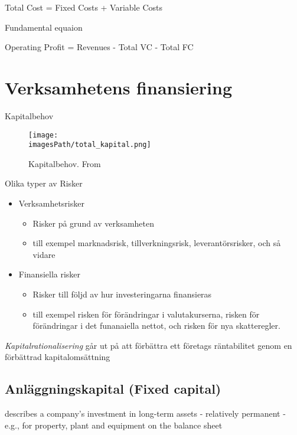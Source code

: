 \begin{center}
    Total Cost = Fixed Costs + Variable Costs
\end{center}

Fundamental equaion 
\begin{center}
    Operating Profit = Revenues - Total VC - Total FC
\end{center}

\section{Verksamhetens finansiering}
Kapitalbehov 
\begin{figure}[H]
    \centering
    \texttt{[image: \\imagesPath/total\_kapital.png]}
    \caption{Kapitalbehov. From \cite{im}}
\end{figure}

Olika typer av Risker 
\begin{itemize}
    \item Verksamhetsrisker
    \begin{itemize}
        \item Risker på grund av verksamheten
        \item till exempel marknadsrisk, tillverkningsrisk, leverantörsrisker, och så vidare
    \end{itemize}
    \item Finansiella risker 
    \begin{itemize}
        \item Risker till följd av hur investeringarna finansieras
        \item till exempel risken för förändringar i valutakurserna, risken för förändringar i det funanaiella nettot, och risken för nya skatteregler.
    \end{itemize}
\end{itemize}

\textit{Kapitalrationalisering} går ut på att förbättra ett företags räntabilitet genom en förbättrad kapitalomsättning
\subsection{Anläggningskapital (Fixed capital)}
describes a company's investment in long-term assets - relatively permanent 
- e.g., for property, plant and equipment on the balance sheet


